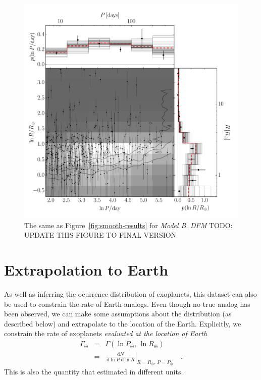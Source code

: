 \documentclass[12pt,preprint]{aastex}
\newcommand{\Fig}[1]{Figure~\ref{fig:#1}}
\newcommand{\fig}[1]{\Fig{#1}}
\newcommand{\figlabel}[1]{\label{fig:#1}}
\newcommand{\dd}{\ensuremath{\,\mathrm{d}}}
\newcommand{\todo}[3]{{\color{#2} \emph{#1} TODO: #3}}
\newcommand{\dfmtodo}[1]{\todo{DFM}{red}{#1}}
\newcommand{\rate}{\ensuremath{\Gamma}}
\newcommand{\radius}{\ensuremath{R}}
\newcommand{\period}{\ensuremath{P}}
\newcommand{\modelb}{\emph{Model B}}
\newcommand{\gammaearth}{{\ensuremath{\rate_\oplus}}}
\begin{document}
\begin{figure}[p]
\begin{center}
\includegraphics[width=\textwidth]{figures/simulation/results.pdf}
\end{center}
\caption{%
The same as \fig{smooth-results} for \modelb.
\dfmtodo{UPDATE THIS FIGURE TO FINAL VERSION}
\figlabel{simulation-results}}
\end{figure}

\section{Extrapolation to Earth}

As well as inferring the ocurrence distribution of exoplanets, this dataset
can also be used to constrain the rate of Earth analogs.
Even though no true analog has been observed, we can make some assumptions
about the distribution (as described below) and extrapolate to the location of
the Earth.
Explicitly, we constrain the rate of exoplanets \emph{evaluated at the
location of Earth}
\begin{eqnarray}
\gammaearth &=& \rate (\ln\period_\oplus,\,\ln\radius_\oplus) \\
&=&
\left.\frac{\dd N}{\dd\ln\period\,\dd\ln\radius}\right|
_{\radius=\radius_\oplus,\,\period=\period_\oplus}\quad.
\end{eqnarray}
This is also the quantity that \citet{petigura} estimated in different units.
\end{document}
